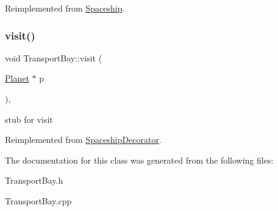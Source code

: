 Reimplemented from \hyperlink{classSpaceship_a93be2d9d2b675ef978d866d4cd7a6524}{Spaceship}.

\mbox{\label{classTransportBay_a01efe0f6bd015b1ae194e111e5589444}} 
\subsubsection{\texorpdfstring{visit()}{visit()}}
{\footnotesize\ttfamily void Transport\+Bay\+::visit (\begin{DoxyParamCaption}\item[{\hyperlink{classPlanet}{Planet} $\ast$}]{p }\end{DoxyParamCaption})\hspace{0.3cm}{\ttfamily [inline]}, {\ttfamily [virtual]}}

stub for visit 

Reimplemented from \hyperlink{classSpaceshipDecorator_ae11d728646b22a33ce5bb465c23bab32}{Spaceship\+Decorator}.



The documentation for this class was generated from the following files\+:\begin{DoxyCompactItemize}
\item 
Transport\+Bay.\+h\item 
Transport\+Bay.\+cpp\end{DoxyCompactItemize}
